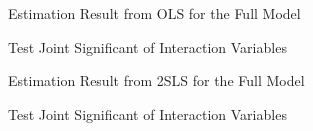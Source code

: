 Estimation Result from OLS for the Full Model
\begin{stlog}\end{stlog}
Test Joint Significant of Interaction Variables
\begin{stlog}\end{stlog}
Estimation Result from 2SLS for the Full Model
\begin{stlog}\end{stlog}
Test Joint Significant of Interaction Variables
\begin{stlog}\end{stlog}
